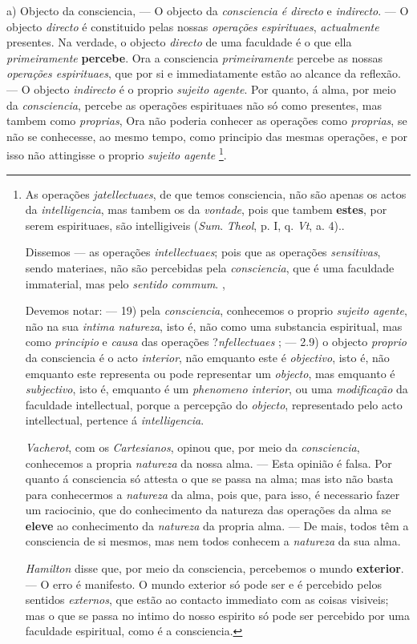 a) Objecto da consciencia, --- O objecto da \emph{consciencia é directo} e \emph{indirecto}. --- O objecto \emph{directo} é constituido pelas nossas \emph{operações}  \emph{ espirituaes}, \emph{actualmente} presentes. Na verdade, o objecto \emph{directo} de uma faculdade é o que ella \emph{primeiramente} \textbf{percebe}. Ora a consciencia \emph{primeiramente} percebe as nossas \emph{operações espirituaes}, que por si e immediatamente estão ao alcance da reflexão. --- O objecto \emph{indirecto} é o proprio \emph{sujeito agente}. Por quanto, á alma, por meio da \emph{consciencia}, percebe as operações espirituaes não só como presentes, mas tambem como \emph{proprias}, Ora não poderia conhecer as operações como \emph{proprias}, se não se conhecesse, ao mesmo tempo, como principio das mesmas operações, e por isso não attingisse o proprio \emph{sujeito agente} \footnote{As operações \emph{jatellectuaes}, de que temos consciencia, não são apenas os actos da \emph{intelligencia}, mas tambem os da \emph{vontade}, pois que tambem \textbf{estes}, por serem espirituaes, são intelligiveis (\emph{Sum}. \emph{Theol}, p. I, q. \emph{Vt}, a. 4)..\par Dissemos --- as operações \emph{intellectuaes}; pois que as operações \emph{sensitivas}, sendo materiaes, não são percebidas pela \emph{consciencia}, que é uma faculdade immaterial, mas pelo \emph{sentido commum}. ,\par Devemos notar: --- 19) pela \emph{consciencia}, conhecemos o proprio \emph{sujeito agente}, não na sua \emph{intima natureza}, isto é, não como uma substancia espiritual, mas como \emph{principio} e \emph{causa} das operações ?\emph{nfellectuaes} ; --- 2.9) o objecto \emph{proprio} da consciencia é o acto \emph{interior}, não emquanto este é \emph{objectivo}, isto é, não emquanto este representa ou pode representar um \emph{objecto}, mas emquanto é \emph{subjectivo}, isto é, emquanto é um \emph{phenomeno interior}, ou uma \emph{modificação} da faculdade intellectual, porque a percepção do \emph{objecto}, representado pelo acto intellectual, pertence á \emph{intelligencia}.\par \emph{Vacherot}, com os \emph{Cartesianos}, opinou que, por meio da \emph{consciencia}, conhecemos a propria \emph{natureza} da nossa alma. --- Esta opinião é falsa. Por quanto á consciencia só attesta o que se passa na alma; mas isto não basta para conhecermos a \emph{natureza} da alma, pois que, para isso, é necessario fazer um raciocinio, que do conhecimento da natureza das operações da alma se \textbf{eleve} ao conhecimento da \emph{natureza} da propria alma. --- De mais, todos têm a consciencia de si mesmos, mas nem todos conhecem a \emph{natureza} da sua alma.\par \emph{Hamilton} disse que, por meio da consciencia, percebemos o mundo \textbf{exterior}. --- O erro é manifesto. O mundo exterior só pode ser e é percebido pelos sentidos \emph{externos}, que estão ao contacto immediato com as coisas visiveis; mas o que se passa no intimo do nosso espirito só pode ser percebido por uma faculdade espiritual, como é a consciencia.}.

